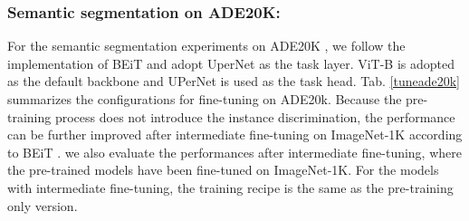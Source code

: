 \documentclass[runningheads]{llncs}
\begin{document}
\begin{table}[h]
\centering
\caption{We provide another experiment results of object detection and instance segmentation on COCO following the implementation of iBOT\cite{ibot}. Intermediate fine-tuning denotes the model is further fine-tuned on ImageNet-1K. Cascaded Mask R-CNN and 1 training schedule are adopted. }
\label{coco}
\end{table}



\subsubsection{Semantic segmentation on ADE20K:} 
For the semantic segmentation experiments on ADE20K \cite{ade20k}, we follow the implementation of BEiT \cite{beit} and adopt UperNet  \cite{upernet} as the task layer. ViT-B \cite{vit} is adopted as the default backbone and UPerNet \cite{upernet} is used as the task head. Tab. \ref{tuneade20k} summarizes the configurations for fine-tuning on ADE20k. Because the pre-training process does not introduce the instance discrimination, the performance can be further improved after intermediate fine-tuning on ImageNet-1K according to BEiT \cite{beit}. we also evaluate the performances after intermediate fine-tuning, where the pre-trained models have been fine-tuned on ImageNet-1K. For the models with intermediate fine-tuning, the training recipe is the same as the pre-training only version.
\end{document}
